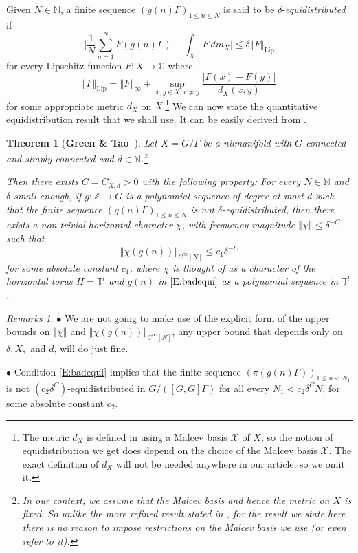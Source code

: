 \documentclass[11pt]{amsart}
\newcommand{\C}{\mathbb{C}}
\newcommand{\T}{\mathbb{T}}
\newcommand{\N}{\mathbb{N}}
\newcommand{\Z}{\mathbb{Z}}
\newcommand{\norm}[1]{\left\Vert #1\right\Vert}
\theoremstyle{plain}
\newtheorem{theorem}{Theorem}[section]
\theoremstyle{definition}
\theoremstyle{remark}
\newtheorem*{remarks}{Remarks}
\begin{document}
Given $N\in\N$, a finite sequence $(g(n)\Gamma)_{1\leq n\leq N}$ is
said to be $\delta$-\emph{equidistributed} if
$$
\Big|\frac{1}{N}\sum_{n=1}^N F(g(n)\Gamma)-\int_{X}F \ dm_X\Big|\leq
\delta \norm{F}_{\text{Lip}}
$$
for every Lipschitz function $F\colon X\to \C$ where
$$
\norm{F}_{\text{Lip}}=\norm{F}_\infty+ \sup_{x,y\in X, x\neq
  y}\frac{|F(x)-F(y)|}{d_X(x,y)}
$$
for some appropriate metric $d_X$ on $X$.\footnote{The metric $d_X$ is
  defined in \cite{GT} using a Malcev basis $\mathcal{X}$ of $X$, so
  the notion of equidistribution we get does depend on the choice of
  the Malcev basis $\mathcal{X}$. The exact definition of $d_X$ will
  not be needed anywhere in our article, so we omit it.}  We can now
state the quantitative equidistribution result that we shall use. It  can be easily
derived from \cite{GT}.
\begin{theorem}[{\bf Green \& Tao~\cite{GT}}]\label{T:GT}
  Let $X=G/\Gamma$ be a nilmanifold with $G$ connected and simply
  connected and $d\in\N$.\footnote{In our context, we assume that the
    Malcev basis and hence the metric on $X$ is fixed. So unlike
    the more refined result stated in \cite{GT}, for the result we state here
     there is no reason to impose
    restrictions on the Malcev basis we use (or even refer to it).}

  Then there exists $C=C_{X,d}>0$ with the following property: For every
  $N\in\N$ and  $\delta$ small enough,
  if $g\colon \Z\to G$ is a polynomial sequence of degree at most $d$
  such that the finite sequence $(g(n)\Gamma)_{1\leq n\leq N}$ is not
  $\delta$-equidistributed, then there exists a non-trivial horizontal character
  $\chi$, with frequency magnitude $\norm{\chi}\leq \delta^{-C}$, such
  that
  \begin{equation}\label{E:badequi}
    \norm{\chi( g(n))}_{C^\infty[N]}\leq  c_1\delta^{-C}
  \end{equation}
  for some absolute constant $c_1$, where $\chi$ is thought of as a
  character of the horizontal torus $H=\T^l$ and $g(n)$ in $\eqref{E:badequi}$  as a
  polynomial sequence in $\T^l$.
\end{theorem}
\begin{remarks}
  $\bullet$ We are not going to make use of the explicit form of the
  upper bounds on $\norm{\chi}$ and $\norm{\chi(
    g(n))}_{C^\infty[N]}$, any upper bound that depends only on
  $\delta,X,$ and $d$, will do just fine.


  $\bullet$ Condition \eqref{E:badequi} implies that the finite
  sequence $(\pi(g(n)\Gamma))_{1\leq n<N_1}$ is not
  $(c_2\delta^C)$-equidistributed in $G/([G,G]\Gamma)$ for all every
  $N_1<c_2\delta^CN$, for some absolute constant $c_2$.
\end{remarks}
\end{document}
